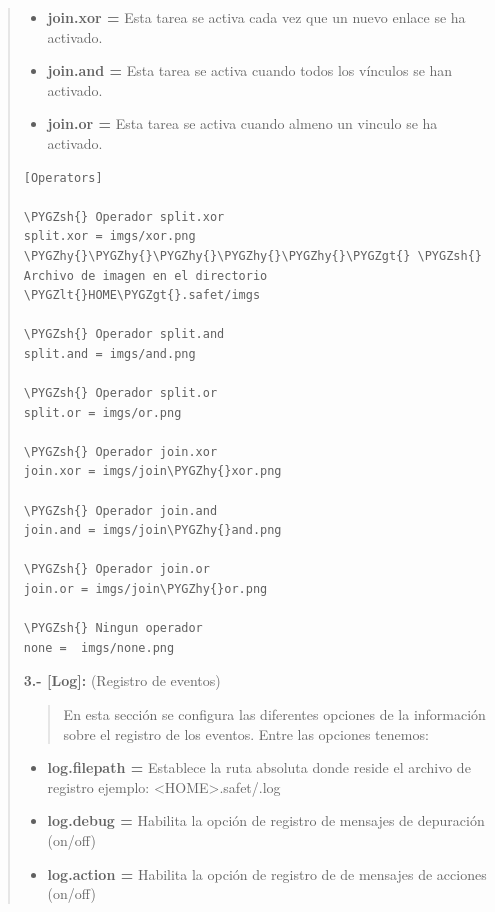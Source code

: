 \documentclass[letterpaper,11pt,spanish]{sphinxmanual}
\def\PYGZlt{\char`\<}
\def\PYGZgt{\char`\>}
\def\PYGZsh{\char`\#}
\def\PYGZhy{\char`\-}
\begin{document}
\begin{quote}
\begin{itemize}
\item {} 
\textbf{join.xor =} Esta tarea se activa cada vez que un nuevo enlace se ha activado.

\item {} 
\textbf{join.and =} Esta tarea se activa cuando todos los vínculos se han activado.

\item {} 
\textbf{join.or =} Esta tarea se activa cuando almeno un vinculo se ha activado.

\end{itemize}

\begin{Verbatim}[commandchars=\\\{\}]
[Operators]

\PYGZsh{} Operador split.xor
split.xor = imgs/xor.png   \PYGZhy{}\PYGZhy{}\PYGZhy{}\PYGZhy{}\PYGZhy{}\PYGZgt{} \PYGZsh{} Archivo de imagen en el directorio \PYGZlt{}HOME\PYGZgt{}.safet/imgs

\PYGZsh{} Operador split.and
split.and = imgs/and.png

\PYGZsh{} Operador split.or
split.or = imgs/or.png

\PYGZsh{} Operador join.xor
join.xor = imgs/join\PYGZhy{}xor.png

\PYGZsh{} Operador join.and
join.and = imgs/join\PYGZhy{}and.png

\PYGZsh{} Operador join.or
join.or = imgs/join\PYGZhy{}or.png

\PYGZsh{} Ningun operador
none =  imgs/none.png
\end{Verbatim}

\textbf{3.- {[}Log{]}:} (Registro de eventos)
\begin{quote}

En esta sección se configura las diferentes opciones de la información sobre el registro de los eventos. Entre las opciones tenemos:
\end{quote}
\begin{itemize}
\item {} 
\textbf{log.filepath =} Establece la ruta absoluta donde reside el archivo de registro ejemplo: \textless{}HOME\textgreater{}.safet/.log

\item {} 
\textbf{log.debug =} Habilita la opción de registro de mensajes de depuración (on/off)

\item {} 
\textbf{log.action =} Habilita la opción de registro de de mensajes de acciones (on/off)


\end{itemize}
\end{quote}
\end{document}

